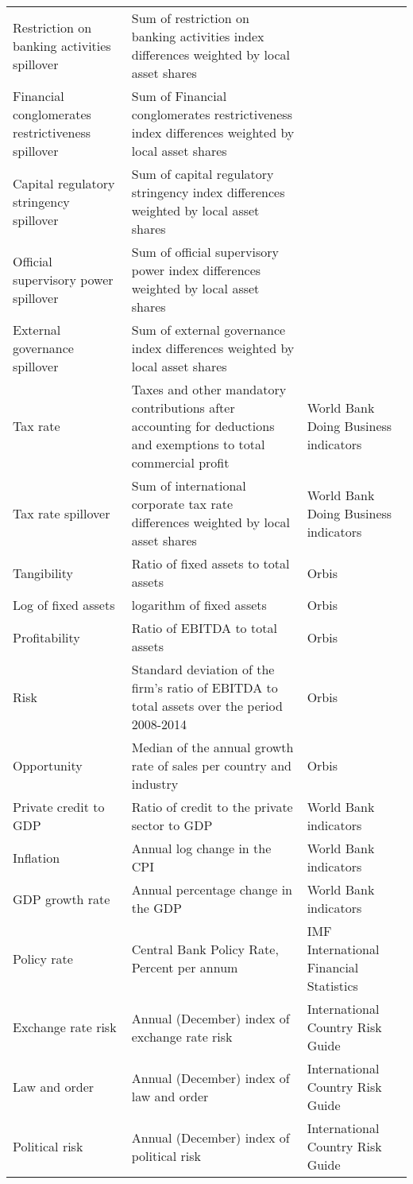 \begin{longtable}{p{2.5in}p{4in}p{2in}}
			Restriction on banking activities spillover & Sum of restriction on banking activities index differences weighted by local asset shares & \cite{barth2013bank}\\
			
			Financial conglomerates restrictiveness spillover & Sum of Financial conglomerates restrictiveness index  differences weighted by local asset shares & \cite{barth2013bank}\\	
			
			Capital regulatory stringency spillover & Sum of capital regulatory stringency index differences weighted by local asset shares & \cite{barth2013bank}\\
			
			Official supervisory power spillover & Sum of official supervisory power index differences weighted by local asset shares & \cite{barth2013bank}\\	
			
			External governance spillover & Sum of external governance index differences weighted by local asset shares & \cite{barth2013bank}\\
				
			Tax rate & Taxes and other mandatory contributions after accounting  for deductions and exemptions to total commercial profit & World Bank Doing Business indicators\\
			Tax rate spillover & Sum of international corporate tax rate  differences weighted by local asset shares& World Bank Doing Business indicators\\
			Tangibility& Ratio of fixed assets to total assets & Orbis\\
			Log of fixed assets& logarithm of fixed assets & Orbis\\
			Profitability& Ratio of EBITDA to total assets & Orbis\\
			Risk & Standard deviation of the firm's ratio of EBITDA to total assets over the period 2008-2014& Orbis\\
			Opportunity & Median of the annual growth rate of sales per country and industry& Orbis\\
			Private credit to GDP & Ratio of credit to the private sector to GDP & World Bank indicators\\	
			Inflation & Annual log change in the CPI & World Bank indicators\\
			GDP growth rate &Annual percentage change in the GDP & World Bank indicators\\
			 Policy rate &Central Bank Policy Rate, Percent per annum & IMF International Financial Statistics \\
			Exchange rate risk &Annual (December) index of exchange rate risk &International Country Risk Guide\\
			Law and order &Annual (December) index of law and order &International Country Risk Guide\\
			Political risk &Annual (December) index of political risk &International Country Risk Guide\\
		\end{longtable}%
